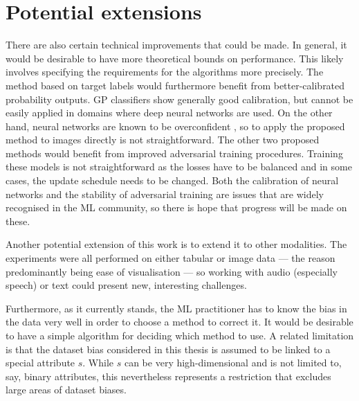 \section{Potential extensions}\label{sec:potential-extentions}
%
There are also certain technical improvements that could be made.
In general, it would be desirable to have more theoretical bounds on performance.
This likely involves specifying the requirements for the algorithms more precisely.
The method based on target labels would furthermore benefit from better-calibrated probability outputs.
\acf{GP} classifiers show generally good calibration,
but cannot be easily applied in domains where deep neural networks are used.
On the other hand, neural networks are known to be overconfident
\citep[especially when using ReLU activations;][]{hein2019relu},
so to apply the proposed method to images directly is not straightforward.
The other two proposed methods would benefit from improved adversarial training procedures.
Training these models is not straightforward as the losses have to be balanced
and in some cases, the update schedule needs to be changed.
Both the calibration of neural networks and the stability of adversarial training
are issues that are widely recognised in the \ac{ML} community,
so there is hope that progress will be made on these.

Another potential extension of this work is to extend it to other modalities.
The experiments were all performed on either tabular or image data
--- the reason predominantly being ease of visualisation ---
so working with audio (especially speech) or text could present new, interesting challenges.



Furthermore, as it currently stands,
the \ac{ML} practitioner has to know the bias in the data very well in order to choose a method to correct it.
It would be desirable to have a simple algorithm for deciding which method to use.
A related limitation is that the dataset bias considered in this thesis
is assumed to be linked to a special attribute \(s\).
While \(s\) can be very high-dimensional and is not limited to, say, binary attributes,
this nevertheless represents a restriction
that excludes large areas of dataset biases.

